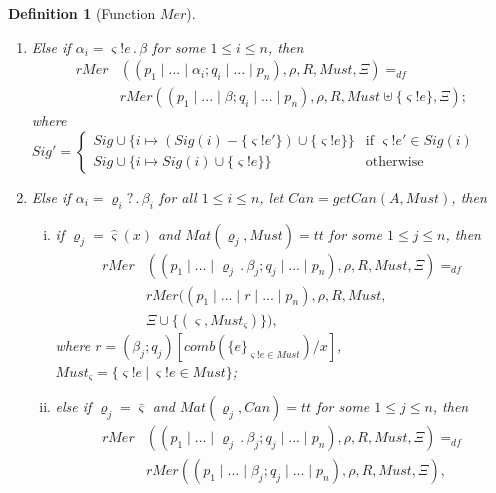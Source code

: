 \documentclass{fcs}
\newtheorem{mydef}{Definition}[section]
\newcommand{\sig}[0]{\varsigma}
\newcommand{\true}[0]{\mathit{tt}}
\DeclareMathOperator{\seq}{;}
\newcommand{\Must}[0]{\mathit{Must}}
\newcommand{\Match}[0]{\mathit{Mat}}
\DeclareMathOperator{\sep}{|}
\DeclareMathOperator{\nex}{.}
\newcommand{\Merge}[0]{\mathit{Mer}}
\newcommand{\rMerge}[0]{\mathit{rMer}}
\newcommand{\comb}[0]{\mathit{comb}}
\newcommand{\Sigs}[0]{\mathit{Sig}}
\newcommand{\SV}[0]{\Xi}
\newcommand{\Can}[0]{\mathit{Can}}
\newcommand{\getCan}[0]{\mathit{getCan}}
\newcommand{\dddef}[0]{=_{df}}
\begin{document}
\begin{mydef}[Function $\Merge$]
\begin{enumerate}
        \item Else if $\alpha_i = \sig!e \nex \beta$ for some $1\le i\le n$, then
        $$\begin{aligned}
        \rMerge&((p_1\sep ...\sep \alpha_i\seq q_{i}\sep...\sep p_n),
        \rho, R, \Must, \SV)
        \dddef\\
        &\rMerge((p_1\sep ...\sep \beta\seq q_{i}\sep...\sep p_n),
        \rho, R, \Must\uplus \{\sig!e\}, \SV)
        ;
        \end{aligned}
        $$
        \ifx
        where
        $
        \Sigs' = \left\{\begin{array}{ll}
            \Sigs\cup \{i\mapsto (\Sigs(i) - \{\sig!e'\})\cup \{\sig!e\}\} & \mbox{if $\sig!e'\in \Sigs(i)$}\\
            \Sigs\cup \{i\mapsto \Sigs(i) \cup \{\sig!e\}\} & \mbox{otherwise}
        \end{array}\right.
        $
        \fi
        \item Else if $\alpha_i = \varrho_i? \nex \beta_i$ for all $1\le i\le n$, let $\Can = \getCan(A, \Must)$, then
        \begin{enumerate}[(i)]
        \item if $\varrho_j = \hat{\sig}(x)$ and $\Match(\varrho_j, \Must)=\true$ for some $1\le j\le n$, then
        $$\begin{aligned}
        \rMerge&((p_1\sep ...\sep \varrho_j\nex \beta_j\seq q_{j}\sep...\sep p_n),
        \rho, R, \Must, \SV)
        \dddef\\
        &\rMerge((p_1\sep ...\sep r\sep...\sep p_n),
        \rho, R, \Must, \\
        &\SV\cup \{(\sig, \Must_\sig)\})
        ,
        \end{aligned}
        $$
        where $r = (\beta_j\seq q_j)[\comb(\{e\}_{\sig!e\in \Must})/x]$, $\Must_{\sig} = \{\sig!e\ |\ \sig!e\in \Must\}$;

        \item
        else if $\varrho_j = \bar{\sig}$ and $\Match(\varrho_j, \Can)=\true$ for some $1\le j\le n$,
        then
        $$\begin{aligned}
        \rMerge&((p_1\sep ...\sep \varrho_j\nex \beta_j\seq q_{j}\sep...\sep p_n),
        \rho, R, \Must,  \SV)
        \dddef\\
        &\rMerge((p_1\sep ...\sep \beta_j\seq q_j\sep...\sep p_n),
        \rho, R, \Must,  \SV)
        ,
        \end{aligned}
        $$


\end{enumerate}
\end{enumerate}
\end{mydef}
\end{document}
